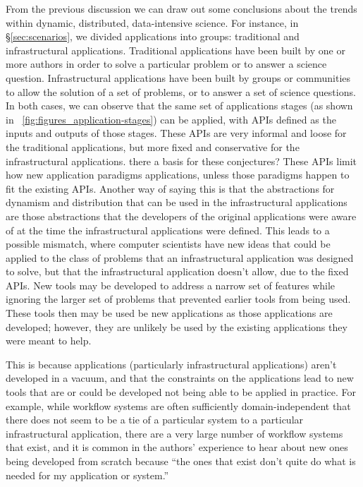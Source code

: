 \documentclass[times]{cpeauth}
\newcommand{\jhanote}[1]{ {\textcolor{blue} { ***Shantenu: #1 }}}
\begin{document}
{From the previous discussion we can draw out some conclusions about the trends
within dynamic, distributed, data-intensive science. For instance, in
\S\ref{sec:scenarios}, we divided applications into groups: traditional and
infrastructural applications.  Traditional applications have been built by one
or more authors in order to solve a particular problem or to answer a science
question.  Infrastructural applications have been built by groups or communities
to allow the solution of a set of problems, or to answer a set of science
questions.  In both cases, we can observe that the same set of applications
stages (as shown in \figurename~\ref{fig:figures_application-stages}) can be
applied, with APIs defined as the inputs and outputs of those stages.  These
APIs are very informal and loose for the traditional applications, but more
fixed and conservative for the infrastructural applications.  %
there a basis for these conjectures?}  These APIs limit how new application paradigms
applications, unless those paradigms happen to fit the existing APIs.  Another
way of saying this is that the abstractions for dynamism and distribution that
can be used in the infrastructural applications are those abstractions that the
developers of the original applications were aware of at the time the
infrastructural applications were defined.  This leads to a possible mismatch,
where computer scientists have new ideas that could be applied to the class of
problems that an infrastructural application was designed to solve, but that the
infrastructural application doesn't allow, due to the fixed APIs.  New tools may
be developed to address a narrow set of features while ignoring the larger set
of problems that prevented earlier tools from being used.  These tools then may
be used be new applications as those applications are developed; however, they
are unlikely be used by the existing applications they were meant to help.

This is because applications (particularly infrastructural applications) aren't
developed in a vacuum, and that the constraints on the applications lead to new
tools that are or could be developed not being able to be applied in practice.
For example, while workflow systems are often sufficiently domain-independent
that there does not seem to be a tie of a particular system to a particular
infrastructural application, there are a very large number of workflow systems
that exist, and it is common in the authors' experience to hear about new ones
being developed from scratch because ``the ones that exist don't quite do what
is needed for my application or system.''
\end{document}
